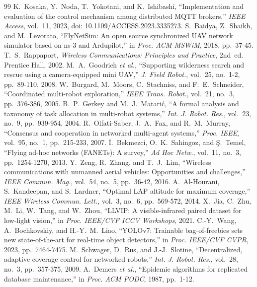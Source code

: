 \documentclass[conference]{IEEEtran}
\begin{document}
\begin{thebibliography}{99}
 K.~Kosaka, Y.~Noda, T.~Yokotani, and K.~Ishibashi, ``Implementation and evaluation of the control mechanism among distributed MQTT brokers,'' \emph{IEEE Access}, vol.~11, 2023, doi: 10.1109/ACCESS.2023.3335273.
 S.~Baidya, Z.~Shaikh, and M.~Levorato, ``FlyNetSim: An open source synchronized UAV network simulator based on ns-3 and Ardupilot,'' in \emph{Proc. ACM MSWiM}, 2018, pp.~37-45.
 T.~S.~Rappaport, \emph{Wireless Communications: Principles and Practice}, 2nd~ed. Prentice Hall, 2002.
 M.~A.~Goodrich \emph{et al.}, ``Supporting wilderness search and rescue using a camera-equipped mini UAV,'' \emph{J. Field Robot.}, vol.~25, no.~1-2, pp.~89-110, 2008.
 W.~Burgard, M.~Moors, C.~Stachniss, and F.~E.~Schneider, ``Coordinated multi-robot exploration,'' \emph{IEEE Trans. Robot.}, vol.~21, no.~3, pp.~376-386, 2005.
 B.~P.~Gerkey and M.~J.~Matari\'c, ``A formal analysis and taxonomy of task allocation in multi-robot systems,'' \emph{Int. J. Robot. Res.}, vol.~23, no.~9, pp.~939-954, 2004.
 R.~Olfati-Saber, J.~A.~Fax, and R.~M.~Murray, ``Consensus and cooperation in networked multi-agent systems,'' \emph{Proc. IEEE}, vol.~95, no.~1, pp.~215-233, 2007.
 \.I.~Bekmezci, O.~K.~Sahingoz, and \c{S}.~Temel, ``Flying ad-hoc networks (FANETs): A survey,'' \emph{Ad Hoc Netw.}, vol.~11, no.~3, pp.~1254-1270, 2013.
 Y.~Zeng, R.~Zhang, and T.~J.~Lim, ``Wireless communications with unmanned aerial vehicles: Opportunities and challenges,'' \emph{IEEE Commun. Mag.}, vol.~54, no.~5, pp.~36-42, 2016.
 A.~Al-Hourani, S.~Kandeepan, and S.~Lardner, ``Optimal LAP altitude for maximum coverage,'' \emph{IEEE Wireless Commun. Lett.}, vol.~3, no.~6, pp.~569-572, 2014.
 X.~Jia, C.~Zhu, M.~Li, W.~Tang, and W.~Zhou, ``LLVIP: A visible-infrared paired dataset for low-light vision,'' in \emph{Proc. IEEE/CVF ICCV Workshops}, 2021.
 C.-Y.~Wang, A.~Bochkovskiy, and H.-Y.~M.~Liao, ``YOLOv7: Trainable bag-of-freebies sets new state-of-the-art for real-time object detectors,'' in \emph{Proc. IEEE/CVF CVPR}, 2023, pp.~7464-7475.
 M.~Schwager, D.~Rus, and J.-J.~Slotine, ``Decentralized, adaptive coverage control for networked robots,'' \emph{Int. J. Robot. Res.}, vol.~28, no.~3, pp.~357-375, 2009.
 A.~Demers \emph{et al.}, ``Epidemic algorithms for replicated database maintenance,'' in \emph{Proc. ACM PODC}, 1987, pp.~1-12.

\end{thebibliography}
\end{document}
